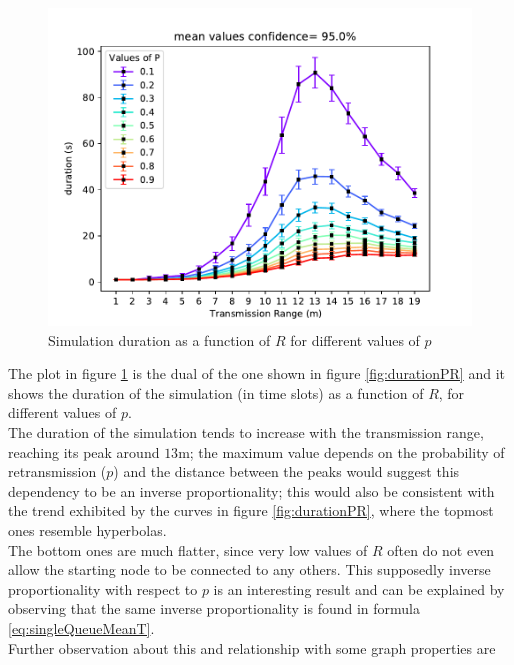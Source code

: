 \begin{figure}[H]
    \begin{center}
        \includegraphics[scale=.7,trim={0 0 0 0.8cm},clip]{img/big_duration (s)_r_mean_95.0.pdf}
    \end{center}
    \vspace*{-0.5cm}
    \caption{Simulation duration as a function of $R$ for different values of $p$}
    \label{fig:durationRP}
\end{figure}
\noindent
The plot in figure \ref{fig:durationRP} is the dual of the one shown in figure
\ref{fig:durationPR} and it shows the duration of the simulation (in time slots)
as a function of $R$, for different values of $p$.\\
The duration of the simulation tends to increase with the transmission range,
reaching its peak around $13$m; the maximum value depends on the probability of
retransmission ($p$) and the distance between the peaks would suggest this
dependency to be an inverse proportionality; this would also be consistent with
the trend exhibited by the curves in figure \ref{fig:durationPR}, where the
topmost ones resemble hyperbolas.\\
The bottom ones are much flatter, since very low values of $R$ often do not
even allow the starting node to be connected to any others. This supposedly
inverse proportionality with respect to $p$ is an interesting result and can be
explained by observing that the same inverse proportionality is found in
formula \ref{eq:singleQueueMeanT}.\\
Further observation about this and relationship with some graph properties are
